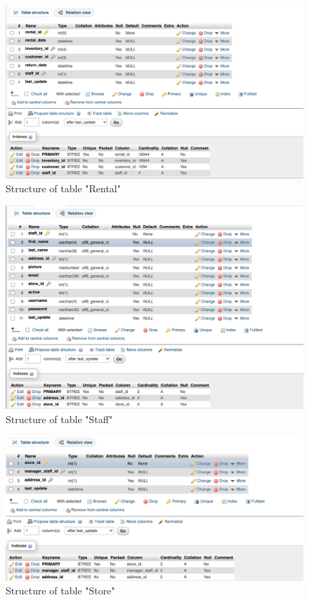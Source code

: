 \documentclass[openany]{article}
\begin{document}
	\begin{figure}[H]
		\includegraphics[width=\textwidth]{table_rental_struct}
		\caption{Structure of table "Rental"}	
	\end{figure}
	\begin{figure}[H]
		\includegraphics[width=\textwidth]{table_staff_struct}
		\caption{Structure of table "Staff"}	
	\end{figure}
	\begin{figure}[H]
		\includegraphics[width=\textwidth]{table_store_struct}
		\caption{Structure of table "Store"}	
	\end{figure}
\end{document}
